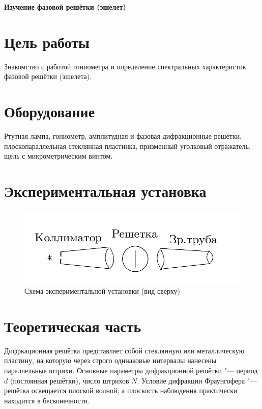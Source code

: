\documentclass[10pt, a4paper]{article}
\begin{document}
\huge
\begin{center}
\textbf{Изучение фазовой решётки (эшелет)}
\end{center}
\parindent=1cm
\large
	\section*{Цель работы}
	
Знакомство с работой гониометра и определение спектральных характеристик фазовой решётки (эшелета).
	\section*{Оборудование}

	Ртутная лампа, гониометр, амплитудная и фазовая дифракционные решётки, плоскопараллельная стеклянная пластинка, призменный уголковый отражатель, щель с микрометрическим винтом.
\section*{Экспериментальная установка}
\begin{figure}[H]
	\includegraphics[width = 1.0\linewidth]{ust.png}
	\caption*{Схема экспериментальной установки (вид сверху)}
\end{figure}
\section*{Теоретическая часть}
Дифркационная решётка представляет собой стеклянную или металлическую пластину, на которую через строго одинаковые интервалы нанесены параллельные штрихи. Основные параметры дифракционной решётки "--- период $d$ (постоянная решётки), число штрихов $N$.
Условие дифракции Фраунгофера "--- решётка освещается плоской волной, а плоскость наблюдения практически находится в бесконечности.
\end{document}
